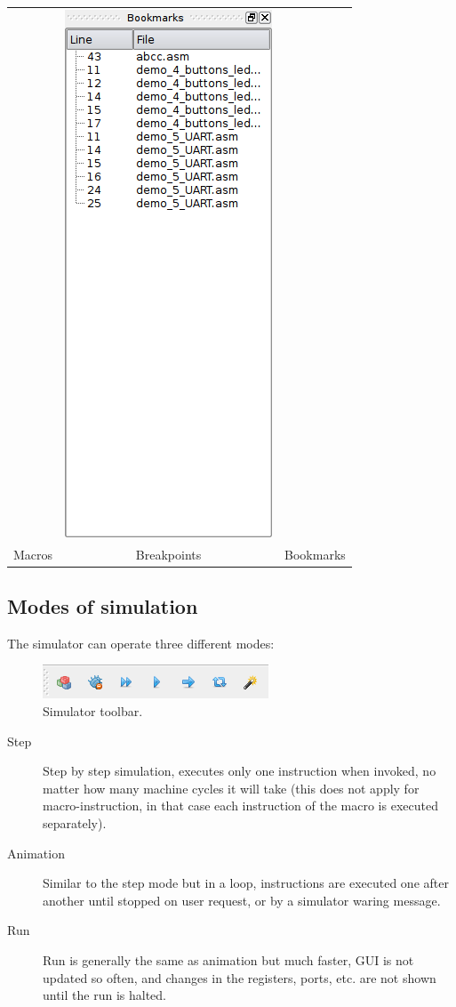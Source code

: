 \begin{table}[h!]
\begin{tabular}{ccc}
                    &
                \includegraphics[width=.3\textwidth]{img/listbookmarks.png}
                \\ Macros & Breakpoints & Bookmarks
            \end{tabular}
        \end{table}


    \subsection{Modes of simulation}
        The simulator can operate three different modes:

        \begin{figure}[h!]
            \centering{}
            \includegraphics[width=.4\textwidth]{img/simulation_panel.png}
            \caption{Simulator toolbar.}
        \end{figure}

        \begin{description}
            \item [Step]
                Step by step simulation, executes only one instruction when invoked, no matter how many machine cycles
                it will take (this does not apply for macro-instruction, in that case each instruction of the macro is
                executed separately).
            \item [Animation]
                Similar to the step mode but in a loop, instructions are executed one after another until stopped on
                user request, or by a simulator waring message.
            \item [Run]
                Run is generally the same as animation but much faster, GUI is not updated so often, and changes in the
                registers, ports, etc. are not shown until the run is halted.
        \end{description}
